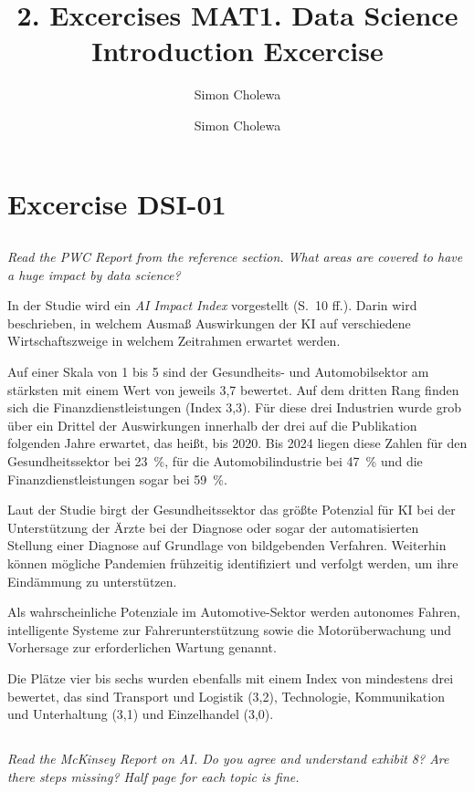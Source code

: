 \documentclass[11pt,a4paper]{article}
\author{Simon Cholewa}
\title{2. Excercises MAT}
\begin{document}
\author{Simon Cholewa}
\title{1. Data Science Introduction Excercise}

\maketitle



\section{Excercise DSI-01}
\subsection{}
\textit{Read the PWC Report from the reference section.
What areas are covered to have a huge impact by data science?}

In der Studie wird ein \emph{AI Impact Index} vorgestellt (S.~10 ff.). Darin wird beschrieben, in welchem Ausmaß Auswirkungen der KI auf verschiedene Wirtschaftszweige in welchem Zeitrahmen erwartet werden.

Auf einer Skala von 1 bis 5 sind der Gesundheits- und Automobilsektor am stärksten mit einem Wert von jeweils 3,7 bewertet. Auf dem dritten Rang finden sich die Finanzdienstleistungen (Index 3,3). Für diese drei Industrien wurde grob über ein Drittel der Auswirkungen innerhalb der drei auf die Publikation folgenden Jahre erwartet, das heißt, bis 2020. Bis 2024 liegen diese Zahlen für den Gesundheitssektor bei 23~\%, für die Automobilindustrie bei 47~\% und die Finanzdienstleistungen sogar bei 59~\%.

Laut der Studie birgt der Gesundheitssektor das größte Potenzial für KI bei der Unterstützung der Ärzte bei der Diagnose oder sogar der automatisierten Stellung einer Diagnose auf Grundlage von bildgebenden Verfahren. Weiterhin können mögliche Pandemien frühzeitig identifiziert und verfolgt werden, um ihre Eindämmung zu unterstützen.

Als wahrscheinliche Potenziale im Automotive-Sektor werden autonomes Fahren, intelligente Systeme zur Fahrerunterstützung sowie die Motorüberwachung und Vorhersage zur erforderlichen Wartung genannt.

Die Plätze vier bis sechs wurden ebenfalls mit einem Index von mindestens drei bewertet, das sind Transport und Logistik (3,2), Technologie, Kommunikation und Unterhaltung (3,1) und Einzelhandel (3,0).

\subsection{}
\textit{Read the McKinsey Report on AI.
Do you agree and understand exhibit 8? Are there steps missing?
Half page for each topic is fine.}
\end{document}

